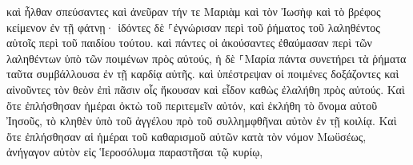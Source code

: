 \documentclass{openreader}
\begin{document}
καὶ ἦλθαν σπεύσαντες καὶ ἀνεῦραν τήν τε Μαριὰμ καὶ τὸν Ἰωσὴφ καὶ τὸ βρέφος κείμενον ἐν τῇ φάτνῃ· 
ἰδόντες δὲ ⸀ἐγνώρισαν περὶ τοῦ ῥήματος τοῦ λαληθέντος αὐτοῖς περὶ τοῦ παιδίου τούτου. 
καὶ πάντες οἱ ἀκούσαντες ἐθαύμασαν περὶ τῶν λαληθέντων ὑπὸ τῶν ποιμένων πρὸς αὐτούς, 
ἡ δὲ ⸀Μαρία πάντα συνετήρει τὰ ῥήματα ταῦτα συμβάλλουσα ἐν τῇ καρδίᾳ αὐτῆς. 
καὶ ὑπέστρεψαν οἱ ποιμένες δοξάζοντες καὶ αἰνοῦντες τὸν θεὸν ἐπὶ πᾶσιν οἷς ἤκουσαν καὶ εἶδον καθὼς ἐλαλήθη πρὸς αὐτούς. 
Καὶ ὅτε ἐπλήσθησαν ἡμέραι ὀκτὼ τοῦ περιτεμεῖν αὐτόν, καὶ ἐκλήθη τὸ ὄνομα αὐτοῦ Ἰησοῦς, τὸ κληθὲν ὑπὸ τοῦ ἀγγέλου πρὸ τοῦ συλλημφθῆναι αὐτὸν ἐν τῇ κοιλίᾳ. 
Καὶ ὅτε ἐπλήσθησαν αἱ ἡμέραι τοῦ καθαρισμοῦ αὐτῶν κατὰ τὸν νόμον Μωϋσέως, ἀνήγαγον αὐτὸν εἰς Ἱεροσόλυμα παραστῆσαι τῷ κυρίῳ, 
\end{document}
